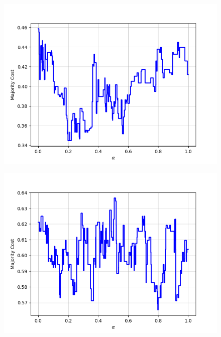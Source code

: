 \begin{figure}[h]
\centering
\begin{minipage}{.19\textwidth}
  \centering
  {\includegraphics[width=\linewidth]{plots/omniglot-intra-ac-cnn/Alphabet_of_the_Magi}}
\end{minipage}
\begin{minipage}{.19\textwidth}
  \centering
  {\includegraphics[width=\linewidth]{plots/omniglot-intra-ac-cnn/Anglo-Saxon_Futhorc}}
\end{minipage}
\begin{minipage}{.19\textwidth}
  \centering

\end{minipage}
\end{figure}
